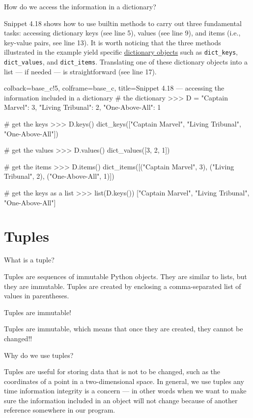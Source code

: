 \documentclass[a4paper,11pt]{book}
\numberwithin{figure}{chapter}
\numberwithin{table}{chapter}
\newcommand{\question}[1]{%
    \begin{tcolorbox}[colback=comp_c!10,colframe=comp_c,sidebyside align=top,width=\linewidth,before skip=1ex]
        #1
    \end{tcolorbox}%
    \switchcolumn%
}
\newcommand{\note}[1]{%
    \begin{tcolorbox}[colback=white!0,colframe=white!10,width=\linewidth,before skip=1ex]
        #1
    \end{tcolorbox}         
}
\begin{document}
\begin{paracol}{2}
\question{\raggedright How do we access the information in a dictionary?}
\note{Snippet 4.18 shows how to use builtin methods to carry out three fundamental tasks: accessing dictionary keys (see line 5), values (see line 9), and items (i.e., key-value pairs, see line 13). It is worth noticing that the three methods illustrated in the example yield specific \href{https://docs.python.org/3/c-api/dict.html}{dictionary objects} such as \texttt{dict\_keys}, \texttt{dict\_values}, and \texttt{dict\_items}. Translating one of these dictionary objects into a list --- if needed --- is straightforward (see line 17).}
\end{paracol}

\begin{pythoncode}[linenos=true,]{colback=base_c!5, colframe=base_c, title=\sffamily Snippet 4.18 --- accessing the information included in a dictionary}
# the dictionary 
>>> D = {"Captain Marvel": 3, "Living Tribunal": 2, "One-Above-All": 1}

# get the keys
>>> D.keys()
dict_keys(["Captain Marvel", "Living Tribunal", "One-Above-All"])

# get the values 
>>> D.values()
dict_values([3, 2, 1])

# get the items
>>> D.items()
dict_items([("Captain Marvel", 3), ("Living Tribunal", 2), ("One-Above-All", 1)])

# get the keys as a list 
>>> list(D.keys())
["Captain Marvel", "Living Tribunal", "One-Above-All"]
\end{pythoncode}

\section{Tuples}

\begin{paracol}{2}
	\question{\raggedright What is a tuple?}
	\note{Tuples are sequences of immutable Python objects. They are similar to lists, but they are immutable. Tuples are created by enclosing a comma-separated list of values in parentheses.}
\end{paracol}

\begin{paracol}{2}
	\question{\raggedright Tuples are immutable!}
	\note{Tuples are immutable, which means that once they are created, they cannot be changed!! }
\end{paracol}

\begin{paracol}{2}
\question{\raggedright Why do we use tuples?}
\note{Tuples are useful for storing data that is not to be changed, such as the coordinates of a point in a two-dimensional space. In general, we use tuples any time information integrity is a concern --- in other words when we want to make sure the information included in an object will not change because of another reference somewhere in our program.}
\end{paracol}
\end{document}
